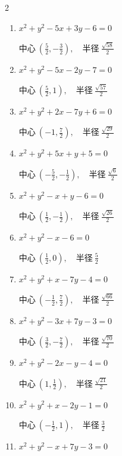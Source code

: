 \begin{multicols}{2}
\begin{enumerate}
  \item $x^{2}+y^{2}-5x+3y-6=0$

        $\displaystyle 中心\: \left(\frac{5}{2},-\frac{3}{2}\right), \quad 半径 \ \frac{\sqrt{58}}{2}$

  \item $x^{2}+y^{2}-5x-2y-7=0$

        $\displaystyle 中心\: \left(\frac{5}{2},1\right), \quad 半径 \ \frac{\sqrt{57}}{2}$

  \item $x^{2}+y^{2}+2x-7y+6=0$

        $\displaystyle 中心\: \left(-1,\frac{7}{2}\right), \quad 半径 \ \frac{\sqrt{29}}{2}$

  \item $x^{2}+y^{2}+5x+y+5=0$

        $\displaystyle 中心\: \left(-\frac{5}{2},-\frac{1}{2}\right), \quad 半径 \ \frac{\sqrt{6}}{2}$

  \item $x^{2}+y^{2}-x+y-6=0$

        $\displaystyle 中心\: \left(\frac{1}{2},-\frac{1}{2}\right), \quad 半径 \ \frac{\sqrt{26}}{2}$

  \item $x^{2}+y^{2}-x-6=0$

        $\displaystyle 中心\: \left(\frac{1}{2},0\right), \quad 半径 \ \frac{5}{2}$

  \item $x^{2}+y^{2}+x-7y-4=0$

        $\displaystyle 中心\: \left(-\frac{1}{2},\frac{7}{2}\right), \quad 半径 \ \frac{\sqrt{66}}{2}$

  \item $x^{2}+y^{2}-3x+7y-3=0$

        $\displaystyle 中心\: \left(\frac{3}{2},-\frac{7}{2}\right), \quad 半径 \ \frac{\sqrt{70}}{2}$

  \item $x^{2}+y^{2}-2x-y-4=0$

        $\displaystyle 中心\: \left(1,\frac{1}{2}\right), \quad 半径 \ \frac{\sqrt{21}}{2}$

  \item $x^{2}+y^{2}+x-2y-1=0$

        $\displaystyle 中心\: \left(-\frac{1}{2},1\right), \quad 半径 \ \frac{3}{2}$

  \item $x^{2}+y^{2}-x+7y-3=0$


\end{enumerate}
\end{multicols}
